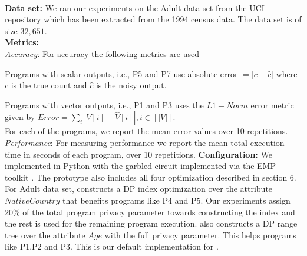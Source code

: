 \\\textbf{Data set:}
We ran our experiments on the Adult data set from the UCI repository \cite{UCI}  which has been extracted from the 1994 census data. The data set is of size $32,651$.
\\\textbf{Metrics:}
\\\textit{Accuracy:} For accuracy the following metrics are used
\squishlist \item Programs with scalar outputs, i.e.,  P5 and P7 use absolute error $ =|c-\hat{c}|$ where $c$ is the true count and $\hat{c}$ is the noisy output.\item Programs with vector outputs, i.e., P1 and P3 uses the $L1-Norm$ error metric given  by $Error=\sum_{i}|V[i]-\hat{V}[i]|, i \in [|V|]$.\\
For each of the programs, we report the mean error values over 10 repetitions.\squishend
\textit{Performance}: For measuring performance we report the mean total execution time in seconds of each program, over 10 repetitions. \textbf{Configuration:} We implemented \system in Python with the garbled circuit implemented via the EMP
toolkit \cite{EMP}. The prototype also includes all four 
optimization described in section 6.
For Adult data set, \system constructs a DP index optimization over
the attribute $NativeCountry$ that benefits programs like P4 and P5. Our experiments assign
20\% of the total program privacy parameter towards constructing the index
and the rest is used for the remaining program execution. \system also constructs a
DP range tree over the attribute $Age$ with the full privacy parameter. This helps programs like P1,P2 and P3. This is our default implementation for \system. %



